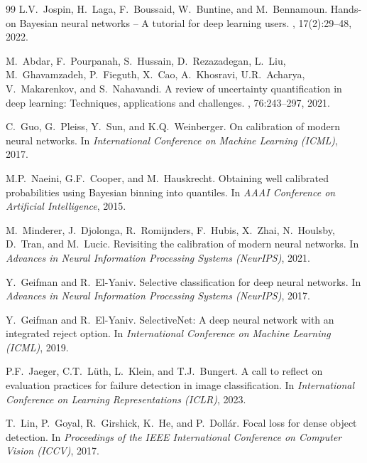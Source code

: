 \documentclass[11pt, a4paper]{article}
\begin{document}
\begin{thebibliography}{99}
L.V.~Jospin, H.~Laga, F.~Boussaid, W.~Buntine, and M.~Bennamoun.
\newblock Hands-on Bayesian neural networks -- A tutorial for deep learning users.
, 17(2):29--48, 2022.

M.~Abdar, F.~Pourpanah, S.~Hussain, D.~Rezazadegan, L.~Liu, M.~Ghavamzadeh, P.~Fieguth, X.~Cao, A.~Khosravi, U.R.~Acharya, V.~Makarenkov, and S.~Nahavandi.
\newblock A review of uncertainty quantification in deep learning: Techniques, applications and challenges.
, 76:243--297, 2021.


C.~Guo, G.~Pleiss, Y.~Sun, and K.Q.~Weinberger.
\newblock On calibration of modern neural networks.
\newblock In {\em International Conference on Machine Learning (ICML)}, 2017.

M.P.~Naeini, G.F.~Cooper, and M.~Hauskrecht.
\newblock Obtaining well calibrated probabilities using Bayesian binning into quantiles.
\newblock In {\em AAAI Conference on Artificial Intelligence}, 2015.

M.~Minderer, J.~Djolonga, R.~Romijnders, F.~Hubis, X.~Zhai, N.~Houlsby, D.~Tran, and M.~Lucic.
\newblock Revisiting the calibration of modern neural networks.
\newblock In {\em Advances in Neural Information Processing Systems (NeurIPS)}, 2021.


Y.~Geifman and R.~El-Yaniv.
\newblock Selective classification for deep neural networks.
\newblock In {\em Advances in Neural Information Processing Systems (NeurIPS)}, 2017.

Y.~Geifman and R.~El-Yaniv.
\newblock SelectiveNet: A deep neural network with an integrated reject option.
\newblock In {\em International Conference on Machine Learning (ICML)}, 2019.

P.F.~Jaeger, C.T.~Lüth, L.~Klein, and T.J.~Bungert.
\newblock A call to reflect on evaluation practices for failure detection in image classification.
\newblock In {\em International Conference on Learning Representations (ICLR)}, 2023.


T.~Lin, P.~Goyal, R.~Girshick, K.~He, and P.~Doll{\'a}r.
\newblock Focal loss for dense object detection.
\newblock In {\em Proceedings of the IEEE International Conference on Computer Vision (ICCV)}, 2017.


\end{thebibliography}
\end{document}
